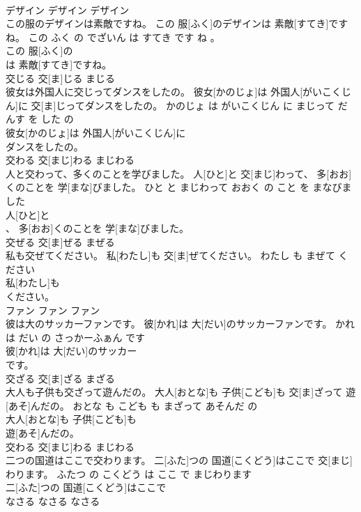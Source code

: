 \documentclass[8pt]{extreport}
\begin{document}
\begin{CJK}{UTF8}{min}
\\	デザイン	デザイン	デザイン	
\\	この服のデザインは素敵ですね。	この 服[ふく]のデザインは 素敵[すてき]ですね。	この ふく の でざいん は すてき です ね 。	
\\	この 服[ふく]の
\\	は 素敵[すてき]ですね。			
\\	交じる	交[ま]じる	まじる	
\\	彼女は外国人に交じってダンスをしたの。	彼女[かのじょ]は 外国人[がいこくじん]に 交[ま]じってダンスをしたの。	かのじょ は がいこくじん に まじって だんす を した の	
\\	彼女[かのじょ]は 外国人[がいこくじん]に
\\	ダンスをしたの。			
\\	交わる	交[まじ]わる	まじわる	
\\	人と交わって、多くのことを学びました。	人[ひと]と 交[まじ]わって、 多[おお]くのことを 学[まな]びました。	ひと と まじわって おおく の こと を まなびました	
\\	人[ひと]と
\\	、 多[おお]くのことを 学[まな]びました。			
\\	交ぜる	交[ま]ぜる	まぜる	
\\	私も交ぜてください。	私[わたし]も 交[ま]ぜてください。	わたし も まぜて ください	
\\	私[わたし]も
\\	ください。			
\\	ファン	ファン	ファン	
\\	彼は大のサッカーファンです。	彼[かれ]は 大[だい]のサッカーファンです。	かれ は だい の さっかーふぁん です	
\\	彼[かれ]は 大[だい]のサッカー
\\	です。			
\\	交ざる	交[ま]ざる	まざる	
\\	大人も子供も交ざって遊んだの。	大人[おとな]も 子供[こども]も 交[ま]ざって 遊[あそ]んだの。	おとな も こども も まざって あそんだ の	
\\	大人[おとな]も 子供[こども]も
\\	遊[あそ]んだの。			
\\	交わる	交[まじ]わる	まじわる	
\\	二つの国道はここで交わります。	二[ふた]つの 国道[こくどう]はここで 交[まじ]わります。	ふたつ の こくどう は ここ で まじわります	
\\	二[ふた]つの 国道[こくどう]はここで
\\	なさる	なさる	なさる	

\end{CJK}
\end{document}
